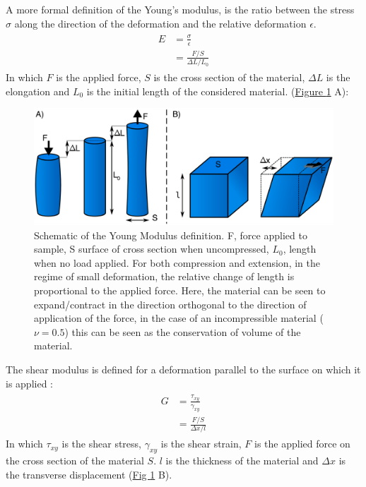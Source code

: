 \documentclass[A4paperpaper,11pt,english]{sphinxmanual}
\begin{document}
A  more formal definition of the Young's modulus, is the ratio between
the stress \(\sigma\) along the direction of the deformation and the relative deformation \(\epsilon\).
\label{index-latex:equation-eqa8}\begin{gather}
\begin{split}E &= \frac{\sigma}{\epsilon} \\
  & = \frac{   F/S }{   \Delta L / L_0        }\end{split}\label{index-latex-eqa8}
\end{gather}
In which \(F\) is the applied force, \(S\) is the cross section of the
material, \(\Delta L\) is the elongation and \(L_0\) is the initial
length of the considered material.  (\hyperref[index-latex:fym]{Figure  \ref*{index-latex:fym}} A):
\begin{figure}[htbp]
\centering
\capstart

\includegraphics[width=0.800\linewidth]{youngm.png}
\caption{Schematic of the Young Modulus definition. F, force applied to sample, S
surface of cross section when uncompressed, \(L_0\), length when no load
applied. For both compression and extension, in the regime of small
deformation, the relative change of length is proportional to the applied
force. Here, the material can be seen to expand/contract in the direction
orthogonal to the direction of application of the force, in the case of an
incompressible material (\(\nu = 0.5\)) this can be seen as the
conservation of volume of the material.}\label{index-latex:fym}\end{figure}

The shear modulus is defined for a deformation parallel to the surface on which it is applied :
\label{index-latex:equation-eqa9}\begin{gather}
\begin{split}G &= \frac{\tau_{xy}}{\gamma_{xy}} \\
  & = \frac{   F/S }{   \Delta x / l        }\end{split}\label{index-latex-eqa9}
\end{gather}
In which \(\tau_{xy}\) is the shear stress, \(\gamma_{xy}\) is the shear strain, \(F\) is the applied force
on the cross section of the material \(S\). \(l\) is the thickness of the material and \(\Delta x\) is the
transverse displacement (\hyperref[index-latex:fym]{Fig  \ref*{index-latex:fym}} B).
\end{document}
